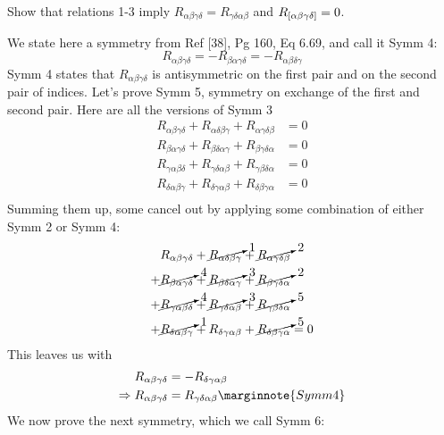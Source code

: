 \documentclass[10pt]{article}
\begin{document}
\begin{example}\label{b3e14}
	Show that relations 1-3 imply $R_{\alpha\beta\gamma\delta}=R_{\gamma\delta\alpha\beta}$ and $R_{[\alpha\beta\gamma\delta]}=0$.
\end{example}
\sol We state here a symmetry from Ref [38], Pg 160, Eq 6.69, and call it Symm 4:
$$
R_{\alpha\beta\gamma\delta} = -R_{\beta\alpha\gamma\delta} = -R_{\alpha\beta\delta\gamma}
$$
Symm 4 states that $R_{\alpha\beta\gamma\delta}$ is antisymmetric on the first pair and on the second pair of indices. Let's prove Symm 5, symmetry on exchange of the first and second pair. Here are all the versions of Symm 3
$$
\begin{aligned}
	R_{\alpha\beta\gamma\delta} + R_{\alpha\delta\beta\gamma}+ R_{\alpha\gamma\delta\beta}&=0\\
	R_{\beta\alpha\gamma\delta} + R_{\beta\delta\alpha\gamma}+ R_{\beta\gamma\delta\alpha}&=0\\
	R_{\gamma\alpha\beta\delta} + R_{\gamma\delta\alpha\beta}+ R_{\gamma\beta\delta\alpha}&=0\\
	R_{\delta\alpha\beta\gamma} + R_{\delta\gamma\alpha\beta}+ R_{\delta\beta\gamma\alpha}&=0\\
\end{aligned}
$$
Summing them up, some cancel out by applying some combination of either Symm 2 or Symm 4:
$$
\begin{aligned}
	R_{\alpha\beta\gamma\delta} + \cancelto{1}{R_{\alpha\delta\beta\gamma}}+ \cancelto{2}{R_{\alpha\gamma\delta\beta}}&\\
	+\cancelto{4}{R_{\beta\alpha\gamma\delta}} + \cancelto{3}{R_{\beta\delta\alpha\gamma}}+ \cancelto{2}{R_{\beta\gamma\delta\alpha}}&\\
	+\cancelto{4}{R_{\gamma\alpha\beta\delta}} + \cancelto{3}{R_{\gamma\delta\alpha\beta}}+ \cancelto{5}{R_{\gamma\beta\delta\alpha}}&\\
	+\cancelto{1}{R_{\delta\alpha\beta\gamma}} + R_{\delta\gamma\alpha\beta}+ \cancelto{5}{R_{\delta\beta\gamma\alpha}}&=0\\
\end{aligned}
$$
This leaves us with
$$
\begin{aligned}
	R_{\alpha\beta\gamma\delta} &= -R_{\delta\gamma\alpha\beta}\\
	\Rightarrow R_{\alpha\beta\gamma\delta} &= R_{\gamma\delta\alpha\beta}\marginnote{Symm 4}
\end{aligned}
$$
We now prove the next symmetry, which we call Symm 6:
\end{document}
